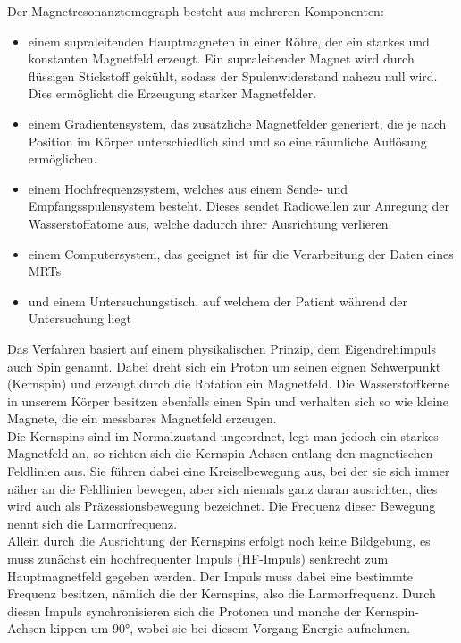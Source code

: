 Der Magnetresonanztomograph besteht aus mehreren Komponenten: 
\begin{itemize}
	\item einem supraleitenden Hauptmagneten in einer Röhre, der ein starkes und konstanten Magnetfeld erzeugt. Ein supraleitender Magnet wird durch flüssigen Stickstoff gekühlt, sodass der Spulenwiderstand nahezu null wird. Dies ermöglicht die Erzeugung starker Magnetfelder.
	\item einem Gradientensystem, das zusätzliche Magnetfelder generiert, die je nach Position im Körper unterschiedlich sind und so eine räumliche Auflösung ermöglichen.
	\item einem Hochfrequenzsystem, welches aus einem Sende- und Empfangsspulensystem besteht. Dieses sendet Radiowellen zur Anregung der Wasserstoffatome aus, welche dadurch ihrer Ausrichtung verlieren.
	\item einem Computersystem, das geeignet ist für die Verarbeitung der Daten eines \ac{MRT}s
	\item und einem Untersuchungstisch, auf welchem der Patient während der Untersuchung liegt
\end{itemize}
Das Verfahren basiert auf einem physikalischen Prinzip, dem Eigendrehimpuls auch Spin genannt. Dabei dreht sich ein \gls{Proton} um seinen eignen Schwerpunkt (Kernspin) und erzeugt durch die Rotation ein Magnetfeld. Die Wasserstoffkerne in unserem Körper besitzen ebenfalls einen Spin und verhalten sich so wie kleine Magnete, die ein messbares Magnetfeld erzeugen.\\
Die Kernspins sind im Normalzustand ungeordnet, legt man jedoch ein starkes Magnetfeld an, so richten sich die Kernspin-Achsen entlang den magnetischen Feldlinien aus. Sie führen dabei eine Kreiselbewegung aus, bei der sie sich immer näher an die Feldlinien bewegen, aber sich niemals ganz daran ausrichten, dies wird auch als Präzessionsbewegung bezeichnet. Die Frequenz dieser Bewegung nennt sich die Larmorfrequenz.\\ 
Allein durch die Ausrichtung der Kernspins erfolgt noch keine Bildgebung, es muss zunächst ein hochfrequenter Impuls (HF-Impuls) senkrecht zum Hauptmagnetfeld gegeben werden. Der Impuls muss dabei eine bestimmte Frequenz besitzen, nämlich die der Kernspins, also die Larmorfrequenz. Durch diesen Impuls synchronisieren sich die Protonen und manche der Kernspin-Achsen kippen um 90°, wobei sie bei diesem Vorgang Energie aufnehmen.\cite[vgl.][]{ChristophPabst2013}\\
